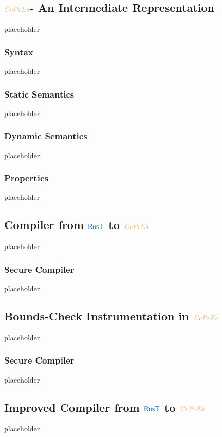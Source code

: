\documentclass[a4paper,12pt]{article}
\begin{document}

\subsection{$\irl{CePeEs}$- An Intermediate Representation}\label{subsec-cepees}
placeholder
\subsubsection{Syntax}\label{subsec-cepees-syntax}
placeholder
\subsubsection{Static Semantics}\label{subsec-cepees-static}
placeholder
\subsubsection{Dynamic Semantics}\label{subsec-cepees-dynamic}
placeholder
\subsubsection{Properties}\label{subsec-cepees-properties}
placeholder


\subsection{Compiler from $\src{RusT}$ to $\irl{CePeEs}$}\label{subsec-rust-to-cepees}
placeholder
\subsubsection{Secure Compiler}\label{subsec-rust-to-cepees-seccomp}
placeholder

\subsection{Bounds-Check Instrumentation in $\irl{CePeEs}$}\label{subsec-softbounds-in-cepees}
placeholder
\subsubsection{Secure Compiler}\label{subsec-softbounds-cepees-seccomp}
placeholder

\subsection{Improved Compiler from $\src{RusT}$ to $\irl{CePeEs}$}\label{subsec-improved-rust-to-cepees}
placeholder
\end{document}
